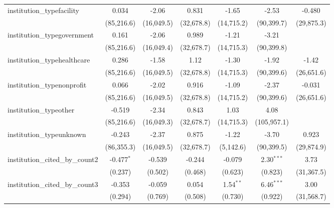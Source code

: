 \begin{tabular}{lcccccc}
   institution\_typefacility             & 0.034         & -2.06         & 0.831         & -1.65       & -2.53         & -0.480\\   
                                         & (85,216.6)    & (16,049.5)    & (32,678.8)    & (14,715.2)  & (90,399.7)    & (29,875.3)\\   
   institution\_typegovernment           & 0.161         & -2.06         & 0.989         & -1.21       & -3.21         &   \\   
                                         & (85,216.6)    & (16,049.4)    & (32,678.7)    & (14,715.3)  & (90,399.8)    &   \\   
   institution\_typehealthcare           & 0.286         & -1.58         & 1.12          & -1.30       & -1.92         & -1.42\\   
                                         & (85,216.6)    & (16,049.5)    & (32,678.8)    & (14,715.3)  & (90,399.6)    & (26,651.6)\\   
   institution\_typenonprofit            & 0.066         & -2.02         & 0.916         & -1.09       & -2.37         & -0.031\\   
                                         & (85,216.6)    & (16,049.5)    & (32,678.8)    & (14,715.2)  & (90,399.6)    & (26,651.6)\\   
   institution\_typeother                & -0.519        & -2.34         & 0.843         & 1.03        & 4.08          &   \\   
                                         & (85,216.6)    & (16,049.3)    & (32,678.7)    & (14,715.3)  & (105,957.1)   &   \\   
   institution\_typeunknown              & -0.243        & -2.37         & 0.875         & -1.22       & -3.70         & 0.923\\   
                                         & (86,355.3)    & (16,049.5)    & (32,678.7)    & (5,142.6)   & (90,399.5)    & (29,874.9)\\   
   institution\_cited\_by\_count2        & -0.477$^{*}$  & -0.539        & -0.244        & -0.079      & 2.30$^{***}$  & 3.73\\   
                                         & (0.237)       & (0.502)       & (0.468)       & (0.623)     & (0.823)       & (31,367.5)\\   
   institution\_cited\_by\_count3        & -0.353        & -0.059        & 0.054         & 1.54$^{**}$ & 6.46$^{***}$  & 3.00\\   
                                         & (0.294)       & (0.769)       & (0.508)       & (0.730)     & (0.922)       & (31,568.7)\\   

\end{tabular}

